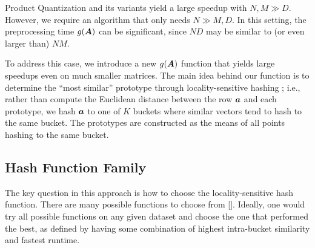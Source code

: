 

Product Quantization and its variants yield a large speedup with $N, M \gg D$. However, we require an algorithm that only needs $N \gg M, D$. In this setting, the preprocessing time $g(\bm{A})$ can be significant, since $ND$ may be similar to (or even larger than) $NM$.

To address this case, we introduce a new $g(\bm{A})$ function that yields large speedups even on much smaller matrices. %
The main idea behind our function is to determine the ``most similar'' prototype through locality-sensitive hashing \cite{lsh}; i.e., rather than compute the Euclidean distance between the row $\bm{a}$ and each prototype, we hash $\bm{a}$ to one of $K$ buckets where similar vectors tend to hash to the same bucket. The prototypes are constructed as the means of all points hashing to the same bucket.


\subsection{Hash Function Family}

The key question in this approach is how to choose the locality-sensitive hash function. There are many possible functions to choose from []. Ideally, one would try all possible functions on any given dataset and choose the one that performed the best, as defined by having some combination of highest intra-bucket similarity and fastest runtime.

